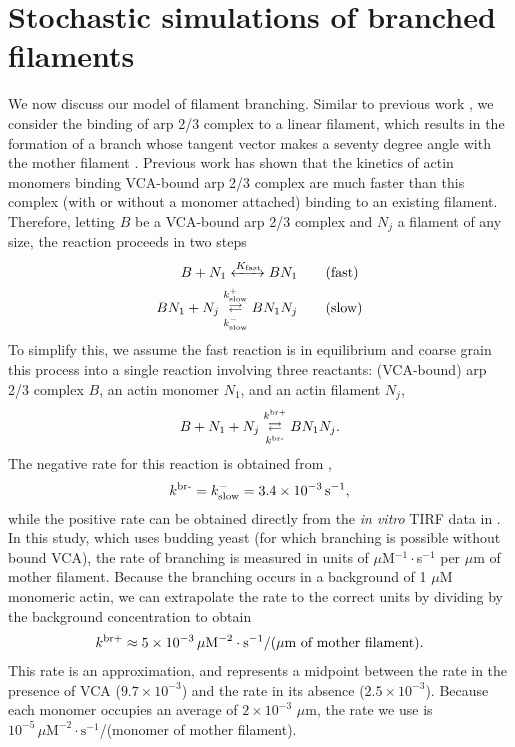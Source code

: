 \documentclass[11pt]{article}
\begin{document}
\section{Stochastic simulations of branched filaments \label{sec:BF}}
We now discuss our model of filament branching. Similar to previous work \cite{ni2019turnover}, we consider the binding of arp 2/3 complex to a linear filament, which results in the formation of a branch whose tangent vector makes a seventy degree angle with the mother filament \cite{pollard2007regulation}. Previous work \cite{beltzner2008pathway} has shown that the kinetics of actin monomers binding VCA-bound arp 2/3 complex are much faster than this complex (with or without a monomer attached) binding to an existing filament. Therefore, letting $B$ be a VCA-bound arp 2/3 complex and $N_j$ a filament of any size, the reaction proceeds in two steps
\begin{subequations}
\label{eq:BothRxnsArp}
\begin{align}
\label{eq:fastrxn}
B + N_1 \xleftrightarrow{K_\text{fast}} BN_1 \qquad & \text{(fast)}\\
BN_1 + N_j \overset{k_\text{slow}^+}{\underset{k_\text{slow}^-}\rightleftarrows} BN_1N_j \qquad & \text{(slow)}
\end{align}
\end{subequations}
To simplify this, we assume the fast reaction is in equilibrium and coarse grain this process into a single reaction involving three reactants: (VCA-bound) arp 2/3 complex $B$, an actin monomer $N_1$, and an actin filament $N_j$, 
\begin{equation}
\label{eq:ArpRxn}
B + N_1 + N_j \overset{k^\text{br+}}{\underset{k^\text{br-}}\rightleftarrows} BN_1N_j. 
\end{equation}
The negative rate for this reaction is obtained from \cite{beltzner2008pathway},
\begin{gather*}
k^\text{br-} = k_\text{slow}^- = 3.4 \times 10^{-3} \, \text{s}^{-1},
\end{gather*}
while the positive rate can be obtained directly from the \emph{in vitro} TIRF data in \cite{smith2013pathway}. In this study, which uses budding yeast (for which branching is possible without bound VCA), the rate of branching is measured in units of $\mu$M$^{-1}\cdot$s$^{-1}$ per $\mu$m of mother filament. Because the branching occurs in a background of 1 $\mu$M monomeric actin, we can extrapolate the rate to the correct units by dividing by the background concentration to obtain
\begin{gather*}
k^\text{br+} \approx 5 \times 10^{-3} \, \mu \text{M}^{-2} \cdot \text{s}^{-1}/(\mu\text{m of mother filament}).
\end{gather*}
This rate is an approximation, and represents a midpoint between the rate in the presence of VCA ($9.7 \times 10^{-3}$) and the rate in its absence ($2.5 \times 10^{-3}$). Because each monomer occupies an average of $2 \times 10^{-3}$ $\mu$m, the rate we use is $10^{-5} \, \mu \text{M}^{-2} \cdot \text{s}^{-1}$/(monomer of mother filament). 
\end{document}
